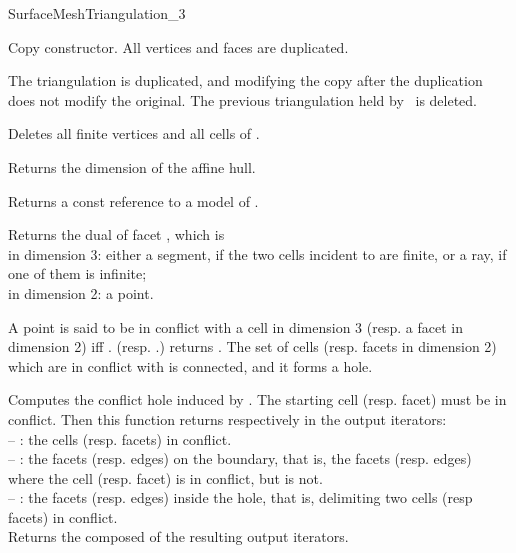 \begin{ccRefConcept}{SurfaceMeshTriangulation_3}

{Copy constructor. All vertices and faces are duplicated.}


{The triangulation  is duplicated, and modifying the copy after the 
duplication does not modify the original. The previous triangulation held
by \ccVar\ is deleted.}

{Deletes all finite vertices and all cells of \ccVar.}

\ccAccessFunctions

{Returns the dimension of the affine hull.}

{Returns a const reference to a model of
  .}


{Returns the dual of facet , which is \\
in dimension 3: either a segment, if the two cells incident to   
are finite, or a ray, if one of them is infinite;\\
in dimension 2: a point.}


A point  is said to be in conflict with a cell  in dimension 3
(resp. a facet  in dimension 2) iff \ccVar.
(resp. \ccVar.) returns .
The set of cells (resp. facets in dimension 2) which are in conflict with
 is connected, and it forms a hole.

{Computes the  conflict hole induced by .  The starting cell
(resp.  facet)  must be in conflict.
Then this function returns respectively in the output iterators:\\
-- : the cells (resp. facets) in conflict.\\
-- : the facets (resp. edges) on the boundary, that is, the facets
(resp. edges)  where the cell (resp. facet)  is in
conflict, but  is not.\\
-- : the facets (resp. edges) inside the hole, that is, delimiting
two cells (resp facets) in conflict.\\
Returns the  composed of the resulting output iterators.}


\end{ccRefConcept}

